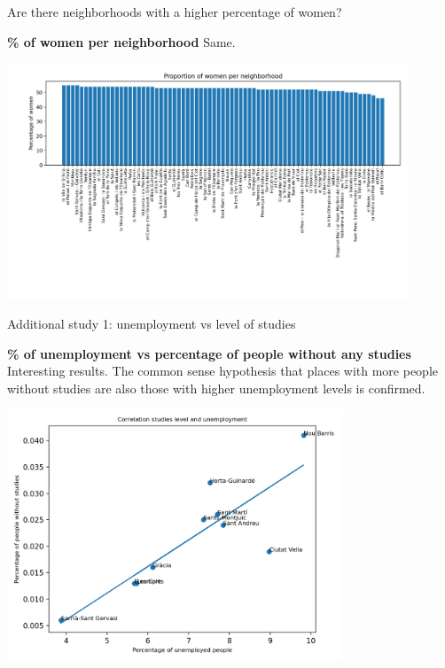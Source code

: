 \documentclass[8pt]{beamer}
\begin{document}
\begin{frame}{Are there neighborhoods with a higher percentage of women?}
\begin{block}{\textbf{\% of women per neighborhood}} 
Same.
\end{block}

\includegraphics[width=12cm, trim= 3cm 0cm 0cm 0cm]{proportion_women_neighborhoods.png}
\end{frame}



\begin{frame}{Additional study 1: unemployment vs level of studies}
\begin{block}{\textbf{\% of unemployment vs percentage of people without any studies}} 
Interesting results. The common sense hypothesis that places with more people without studies are also those with higher unemployment levels is confirmed.
\end{block}

\includegraphics[width=10cm]{correlation_studies_level_unemployment_districts.png}

\end{frame}
\end{document}
